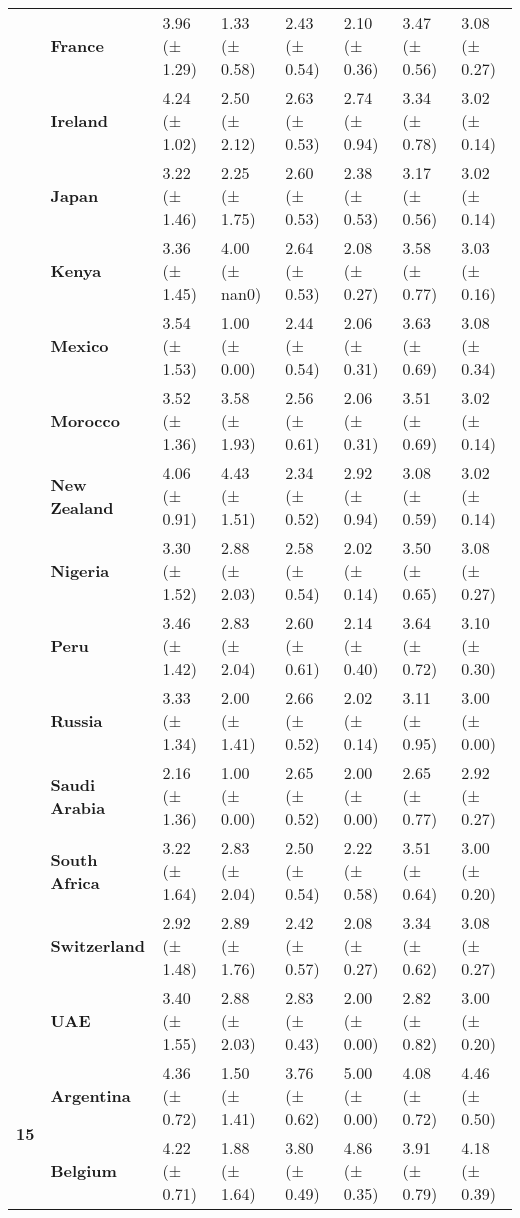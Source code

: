 \begin{longtable}{llllllll}
\textbf{} & \textbf{France} & 3.96 (± 1.29) & 1.33 (± 0.58) & 2.43 (± 0.54) & 2.10 (± 0.36) & 3.47 (± 0.56) & 3.08 (± 0.27) \\
\textbf{} & \textbf{Ireland} & 4.24 (± 1.02) & 2.50 (± 2.12) & 2.63 (± 0.53) & 2.74 (± 0.94) & 3.34 (± 0.78) & 3.02 (± 0.14) \\
\textbf{} & \textbf{Japan} & 3.22 (± 1.46) & 2.25 (± 1.75) & 2.60 (± 0.53) & 2.38 (± 0.53) & 3.17 (± 0.56) & 3.02 (± 0.14) \\
\textbf{} & \textbf{Kenya} & 3.36 (± 1.45) & 4.00 (± nan0) & 2.64 (± 0.53) & 2.08 (± 0.27) & 3.58 (± 0.77) & 3.03 (± 0.16) \\
\textbf{} & \textbf{Mexico} & 3.54 (± 1.53) & 1.00 (± 0.00) & 2.44 (± 0.54) & 2.06 (± 0.31) & 3.63 (± 0.69) & 3.08 (± 0.34) \\
\textbf{} & \textbf{Morocco} & 3.52 (± 1.36) & 3.58 (± 1.93) & 2.56 (± 0.61) & 2.06 (± 0.31) & 3.51 (± 0.69) & 3.02 (± 0.14) \\
\textbf{} & \textbf{New Zealand} & 4.06 (± 0.91) & 4.43 (± 1.51) & 2.34 (± 0.52) & 2.92 (± 0.94) & 3.08 (± 0.59) & 3.02 (± 0.14) \\
\textbf{} & \textbf{Nigeria} & 3.30 (± 1.52) & 2.88 (± 2.03) & 2.58 (± 0.54) & 2.02 (± 0.14) & 3.50 (± 0.65) & 3.08 (± 0.27) \\
\textbf{} & \textbf{Peru} & 3.46 (± 1.42) & 2.83 (± 2.04) & 2.60 (± 0.61) & 2.14 (± 0.40) & 3.64 (± 0.72) & 3.10 (± 0.30) \\
\textbf{} & \textbf{Russia} & 3.33 (± 1.34) & 2.00 (± 1.41) & 2.66 (± 0.52) & 2.02 (± 0.14) & 3.11 (± 0.95) & 3.00 (± 0.00) \\
\textbf{} & \textbf{Saudi Arabia} & 2.16 (± 1.36) & 1.00 (± 0.00) & 2.65 (± 0.52) & 2.00 (± 0.00) & 2.65 (± 0.77) & 2.92 (± 0.27) \\
\textbf{} & \textbf{South Africa} & 3.22 (± 1.64) & 2.83 (± 2.04) & 2.50 (± 0.54) & 2.22 (± 0.58) & 3.51 (± 0.64) & 3.00 (± 0.20) \\
\textbf{} & \textbf{Switzerland} & 2.92 (± 1.48) & 2.89 (± 1.76) & 2.42 (± 0.57) & 2.08 (± 0.27) & 3.34 (± 0.62) & 3.08 (± 0.27) \\
\textbf{} & \textbf{UAE} & 3.40 (± 1.55) & 2.88 (± 2.03) & 2.83 (± 0.43) & 2.00 (± 0.00) & 2.82 (± 0.82) & 3.00 (± 0.20) \\
\cline{1-8}
\multirow[t]{19}{*}{\textbf{15}} & \textbf{Argentina} & 4.36 (± 0.72) & 1.50 (± 1.41) & 3.76 (± 0.62) & 5.00 (± 0.00) & 4.08 (± 0.72) & 4.46 (± 0.50) \\
\textbf{} & \textbf{Belgium} & 4.22 (± 0.71) & 1.88 (± 1.64) & 3.80 (± 0.49) & 4.86 (± 0.35) & 3.91 (± 0.79) & 4.18 (± 0.39) \\

\end{longtable}
